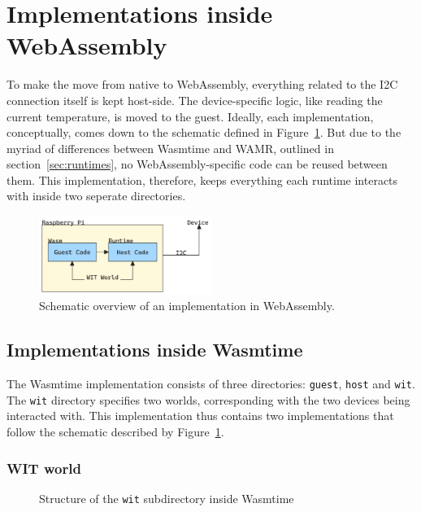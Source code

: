 \section{Implementations inside WebAssembly}

To make the move from native to WebAssembly, everything related to the I2C connection itself is kept host-side. The device-specific logic, like reading the current temperature, is moved to the guest. Ideally, each implementation, conceptually, comes down to the schematic defined in Figure~\ref{fig:schematic}. But due to the myriad of differences between Wasmtime and WAMR, outlined in section~\ref{sec:runtimes}, no WebAssembly-specific code can be reused between them. This implementation, therefore, keeps everything each runtime interacts with inside two seperate directories.

\begin{figure}[ht]
    \centering
    \includegraphics[width=0.5\textwidth]{figures/schema.png}
    \caption{Schematic overview of an implementation in WebAssembly.}
    \label{fig:schematic}
\end{figure}

\subsection{Implementations inside Wasmtime}

The Wasmtime implementation consists of three directories: \texttt{guest}, \texttt{host} and \texttt{wit}. The \texttt{wit} directory specifies two worlds, corresponding with the two devices being interacted with. This implementation thus contains two implementations that follow the schematic described by Figure~\ref{fig:schematic}.


\subsubsection{WIT world}

\begin{figure}[h]
\caption{Structure of the \texttt{wit} subdirectory inside Wasmtime}
\label{fig:wit:dirtree}
\end{figure}

